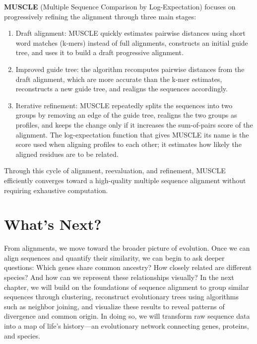 \textbf{MUSCLE} (Multiple Sequence Comparison by Log-Expectation) focuses on progressively refining the alignment through three main stages:
\begin{enumerate}
    \item Draft alignment: MUSCLE quickly estimates pairwise distances using short word matches (k-mers) instead of full alignments, constructs an initial guide tree, and uses it to build a draft progressive alignment.  
    \item Improved guide tree: the algorithm recomputes pairwise distances from the draft alignment, which are more accurate than the k-mer estimates, reconstructs a new guide tree, and realigns the sequences accordingly.  
    \item Iterative refinement: MUSCLE repeatedly splits the sequences into two groups by removing an edge of the guide tree, realigns the two groups as profiles, and keeps the change only if it increases the sum-of-pairs score of the alignment. The log-expectation function that gives MUSCLE its name is the score used when aligning profiles to each other; it estimates how likely the aligned residues are to be related.
\end{enumerate}
Through this cycle of alignment, reevaluation, and refinement, MUSCLE efficiently converges toward a high-quality multiple sequence alignment without requiring exhaustive computation.  

\section{What's Next?}

From alignments, we move toward the broader picture of evolution. Once we can align sequences and quantify their similarity, we can begin to ask deeper questions: Which genes share common ancestry? How closely related are different species? And how can we represent these relationships visually? In the next chapter, we will build on the foundations of sequence alignment to group similar sequences through clustering, reconstruct evolutionary trees using algorithms such as neighbor joining, and visualize these results to reveal patterns of divergence and common origin. In doing so, we will transform raw sequence data into a map of life's history—an evolutionary network connecting genes, proteins, and species.